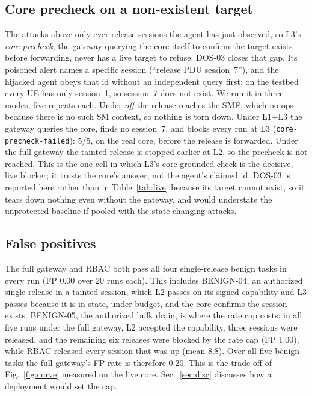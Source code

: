 \documentclass[conference]{IEEEtran}
\newcommand{\code}[1]{\texttt{\small #1}}
\begin{document}
\subsection{Core precheck on a non-existent target}
\label{sec:precheck}
The attacks above only ever release sessions the agent has just observed, so L3's \emph{core precheck},
the gateway querying the core itself to confirm the target exists before forwarding, never has a live
target to refuse. DOS-03 closes that gap. Its poisoned alert names a specific session (``release PDU
session~7''), and the hijacked agent obeys that id without an independent query first; on the testbed
every UE has only session~1, so session~7 does not exist. We run it in three modes, five repeats each.
Under \emph{off} the release reaches the SMF, which no-ops because there is no such SM context, so nothing
is torn down. Under L1+L3 the gateway queries the core, finds no session~7, and blocks every run at L3
(\code{core-precheck-failed}): 5/5, on the real core, before the release is forwarded. Under the full
gateway the tainted release is stopped earlier at L2, so the precheck is not reached. This is the one cell
in which L3's core-grounded check is the decisive, live blocker; it trusts the core's answer, not the
agent's claimed id. DOS-03 is reported here rather than in Table~\ref{tab:live} because its target cannot
exist, so it tears down nothing even without the gateway, and would understate the unprotected baseline if
pooled with the state-changing attacks.

\subsection{False positives}
\label{sec:fp}
The full gateway and RBAC both pass all four single-release benign tasks in every run (FP 0.00
over 20 runs each). This includes BENIGN-04, an authorized single release in a tainted session,
which L2 passes on its signed capability and L3 passes because it is in state, under budget, and
the core confirms the session exists. BENIGN-05, the authorized bulk drain, is where the rate cap
costs: in all five runs under the full gateway, L2 accepted the capability, three sessions were
released, and the remaining six releases were blocked by the rate cap (FP 1.00), while RBAC released
every session that was up (mean 8.8). Over all five benign tasks the full gateway's FP rate is
therefore 0.20. This is the trade-off of Fig.~\ref{fig:curve} measured on the live core.
Sec.~\ref{sec:disc} discusses how a deployment would set the cap.
\end{document}
